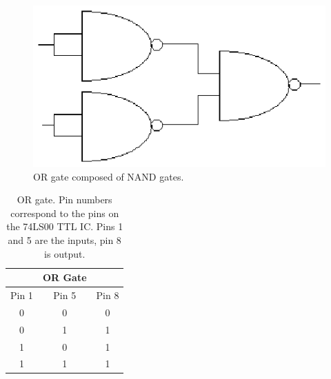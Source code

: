 \documentclass[11pt,onecolumn,letter]{article}
\begin{document}
%
%
\begin{figure}
\center
\includegraphics{OR.eps}
\caption{OR gate composed of NAND gates.}\label{fig:OR}
\end{figure}
%
%
\begin{table}
\center
\begin{tabular}{ccc}
	& OR Gate	& \\
\hline
Pin 1	& Pin 5	& Pin 8 \\
\hline
0	& 0	& 0 \\
0	& 1	& 1 \\
1	& 0	& 1 \\
1	& 1	& 1 \\
\end{tabular}
\caption{OR gate. Pin numbers correspond to the pins on the 74LS00 TTL IC. Pins 1 and 5 are the inputs, pin 8 is output.}\label{tab:OR}
\end{table}

%
%
\end{document}
